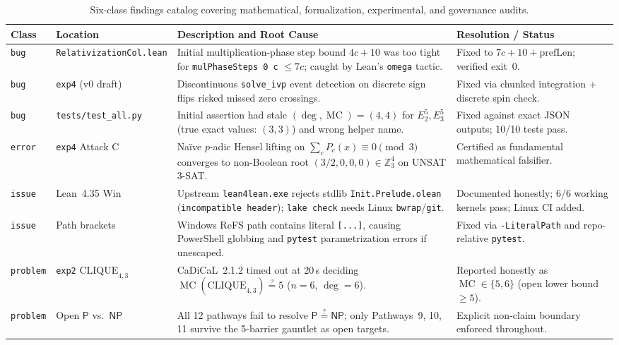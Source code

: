\documentclass[11pt,reqno]{amsart}
\newcommand{\code}[1]{\texttt{\nolinkurl{#1}}}
\theoremstyle{definition}
\newcommand{\Z}{\mathbb{Z}}
\newcommand{\MC}{\operatorname{MC}}
\newcommand{\PP}{\mathsf{P}}
\newcommand{\NP}{\mathsf{NP}}
\begin{document}
\begin{table}[htbp]
\centering
\caption{Six-class findings catalog covering mathematical, formalization, experimental,
and governance audits.}
\label{tab:taxonomy}
\scriptsize
\begin{tabularx}{\textwidth}{@{}l>{\raggedright\arraybackslash}p{2.75cm}Y{1.32}Y{0.68}@{}}
\toprule
\textbf{Class} & \textbf{Location} & \textbf{Description and Root Cause} & \textbf{Resolution / Status} \\
\midrule
\texttt{bug} & \code{RelativizationCol.lean} & Initial multiplication-phase step bound $4c+10$ was too tight for \texttt{mulPhaseSteps 0 c} $\le 7c$; caught by Lean's \texttt{omega} tactic. & Fixed to $7c+10+\text{prefLen}$; verified exit~0. \\
\addlinespace[2pt]
\texttt{bug} & \texttt{exp4} (v0 draft) & Discontinuous \code{solve_ivp} event detection on discrete sign flips risked missed zero crossings. & Fixed via chunked integration + discrete spin check. \\
\addlinespace[2pt]
\texttt{bug} & \code{tests/test_all.py} & Initial assertion had stale $(\deg,\MC)=(4,4)$ for $E_2^5, E_3^5$ (true exact values: $(3,3)$) and wrong helper name. & Fixed against exact JSON outputs; 10/10 tests pass. \\
\addlinespace[2pt]
\texttt{error} & \texttt{exp4} Attack C & Na\"ive $p$-adic Hensel lifting on $\sum_c P_c(x) \equiv 0 \pmod{3}$ converges to non-Boolean root $(3/2,0,0,0)\in\Z_3^4$ on UNSAT 3-SAT. & Certified as fundamental mathematical falsifier. \\
\addlinespace[2pt]
\texttt{issue} & Lean~4.35 Win & Upstream \code{lean4lean.exe} rejects stdlib \code{Init.Prelude.olean} (\texttt{incompatible header}); \texttt{lake check} needs Linux \texttt{bwrap}/\texttt{git}. & Documented honestly; 6/6 working kernels pass; Linux CI added. \\
\addlinespace[2pt]
\texttt{issue} & Path brackets & Windows ReFS path contains literal \texttt{[...]}, causing PowerShell globbing and \texttt{pytest} parametrization errors if unescaped. & Fixed via \texttt{-LiteralPath} and repo-relative \texttt{pytest}. \\
\addlinespace[2pt]
\texttt{problem} & \texttt{exp2} $\mathrm{CLIQUE}_{4,3}$ & CaDiCaL~2.1.2 timed out at 20\,s deciding $\MC(\mathrm{CLIQUE}_{4,3}) \stackrel{?}{=} 5$ ($n=6$, $\deg=6$). & Reported honestly as $\MC \in \{5,6\}$ (open lower bound $\ge 5$). \\
\addlinespace[2pt]
\texttt{problem} & Open $\PP$ vs.\ $\NP$ & All 12 pathways fail to resolve $\PP \stackrel{?}{=} \NP$; only Pathways~9, 10, 11 survive the 5-barrier gauntlet as open targets. & Explicit non-claim boundary enforced throughout. \\

\end{tabularx}
\end{table}
\end{document}
